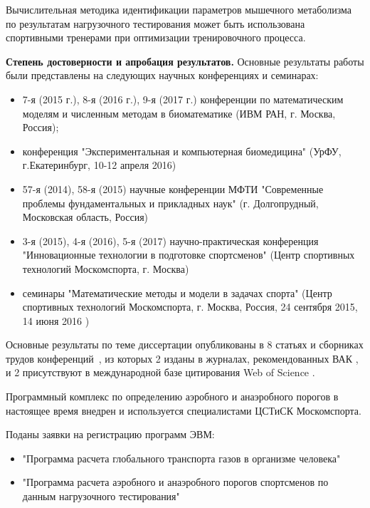Вычислительная методика идентификации параметров мышечного метаболизма по результатам нагрузочного тестирования может быть использована спортивными тренерами при оптимизации тренировочного процесса.

\textbf{Степень достоверности и апробация результатов.} 
Основные результаты работы были представлены на следующих научных конференциях и семинарах:

\noindent
\begin{itemize}
  
  \item 7-я (2015 г.), 8-я (2016 г.), 9-я (2017 г.) конференции по математическим моделям и численным методам в биоматематике (ИВМ РАН, г. Москва, Россия); 
  
  \item конференция "Экспериментальная и компьютерная биомедицина" (УрФУ, г.Екатеринбург, 10-12 апреля 2016)
  
  \item 57-я (2014), 58-я (2015) научные конференции МФТИ "Современные проблемы фундаментальных и прикладных наук" (г. Долгопрудный, Московская область, Россия)
  
  \item 3-я (2015), 4-я (2016), 5-я (2017) научно-практическая конференция "Инновационные технологии в подготовке спортсменов" (Центр спортивных технологий Москомспорта, г. Москва)
  
  \item семинары "Математические методы и модели в задачах спорта" (Центр спортивных технологий Москомспорта, г. Москва, Россия, 24 сентября 2015, 14 июня 2016 )
\end{itemize}

Основные результаты по теме диссертации опубликованы в 8 статьях и сборниках трудов конференций~\cite{GolovComp2017, GolovCmodel2017, GolovIt2017,GolovSp2015,GolovSp2016,TimmeSp2016,GolovEkb2016,Simakov2015}, из которых 2 изданы в журналах, рекомендованных ВАК \cite{GolovIt2017, GolovCmodel2017}, и 2 присутствуют в международной базе цитирования Web of Science \cite{GolovComp2017, GolovCmodel2017}.

Программный комплекс по определению аэробного и анаэробного порогов в настоящее время внедрен и используется специалистами ЦСТиСК Москомспорта.

Поданы заявки на регистрацию программ ЭВМ:
\begin{itemize}
    \item "Программа расчета глобального транспорта газов в организме человека"
    \item "Программа расчета аэробного и анаэробного порогов спортсменов по данным нагрузочного тестирования"
\end{itemize}
 
